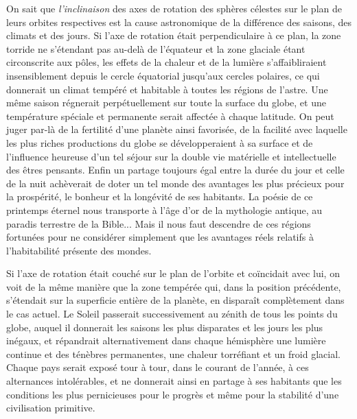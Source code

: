 \documentclass[a4paper, 11pt, oneside]{article}
\begin{document}
On sait que \emph{l'inclinaison} des axes de rotation des sphères célestes sur le plan de leurs orbites respectives est la cause astronomique de la différence des saisons, des climats et des jours. Si l'axe de rotation était perpendiculaire à ce plan, la zone torride ne s'étendant pas au-delà de l'équateur et la zone glaciale étant circonscrite aux pôles, les effets de la chaleur et de la lumière s'affaibliraient insensiblement depuis le cercle équatorial jusqu'aux cercles polaires, ce qui donnerait un climat tempéré et habitable à toutes les régions de l'astre. Une même saison régnerait perpétuellement sur toute la surface du globe, et une température spéciale et permanente serait affectée à chaque latitude. On peut juger par-là de la fertilité d'une planète ainsi favorisée, de la facilité avec laquelle les plus riches productions du globe se développeraient à sa surface et de l'influence heureuse d'un tel séjour sur la double vie matérielle et intellectuelle des êtres pensants. Enfin un partage toujours égal entre la durée du jour et celle de la nuit achèverait de doter un tel monde des avantages les plus précieux pour la prospérité, le bonheur et la longévité de ses habitants. La poésie de ce printemps éternel nous transporte à l'âge d'or de la mythologie antique, au paradis terrestre de la Bible... Mais il nous faut descendre de ces régions fortunées pour ne considérer simplement que les avantages réels relatifs à l'habitabilité présente des mondes.

Si l'axe de rotation était couché sur le plan de l'orbite et coïncidait avec lui, on voit de la même manière que la zone tempérée qui, dans la position précédente, s'étendait sur la superficie entière de la planète, en disparaît complètement dans le cas actuel. Le Soleil passerait successivement au zénith de tous les points du globe, auquel il donnerait les saisons les plus disparates et les jours les plus inégaux, et répandrait alternativement dans chaque hémisphère une lumière continue et des ténèbres permanentes, une chaleur torréfiant et un froid glacial. Chaque pays serait exposé tour à tour, dans le courant de l'année, à ces alternances intolérables, et ne donnerait ainsi en partage à ses habitants que les conditions les plus pernicieuses pour le progrès et même pour la stabilité d'une civilisation primitive.
\end{document}
